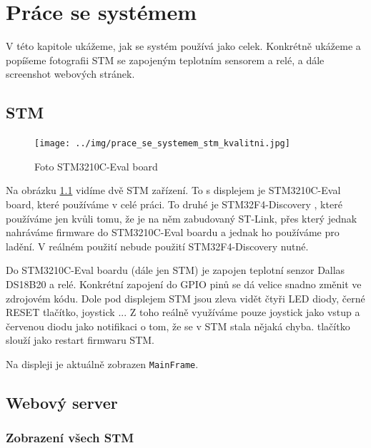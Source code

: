 
\chapter{Práce se systémem}
V této kapitole ukážeme, jak se systém používá jako celek.
Konkrétně ukážeme a popíšeme fotografii STM se zapojeným teplotním sensorem a relé, a dále
screenshot webových stránek.

\section{STM}

\begin{figure}[tbh!]
\texttt{[image: ../img/prace\_se\_systemem\_stm\_kvalitni.jpg]}
\caption{Foto STM3210C-Eval board}
\label{stm-foto}
\end{figure}

Na obrázku \ref{stm-foto} vidíme dvě STM zařízení.
To s displejem je STM3210C-Eval board, které používáme v celé práci.
To druhé je STM32F4-Discovery \cite{STM32F4-Discovery}, které používáme jen kvůli tomu, že je na něm
zabudovaný ST-Link, přes který jednak nahráváme firmware do STM3210C-Eval boardu a jednak ho používáme
pro ladění.
V reálném použití nebude použití STM32F4-Discovery nutné.

Do STM3210C-Eval boardu (dále jen STM) je zapojen teplotní senzor Dallas DS18B20 \cite{DS18B20}
a relé.
Konkrétní zapojení do GPIO pinů se dá velice snadno změnit ve zdrojovém kódu.
Dole pod displejem STM jsou zleva vidět čtyři LED diody, černé RESET tlačítko, joystick ...
Z toho reálně využíváme pouze joystick jako vstup a červenou diodu jako notifikaci o tom, že
se v STM stala nějaká chyba.
 tlačítko slouží jako restart firmwaru STM.

Na displeji je aktuálně zobrazen \texttt{MainFrame}.


\section{Webový server}

\subsection{Zobrazení všech STM}

